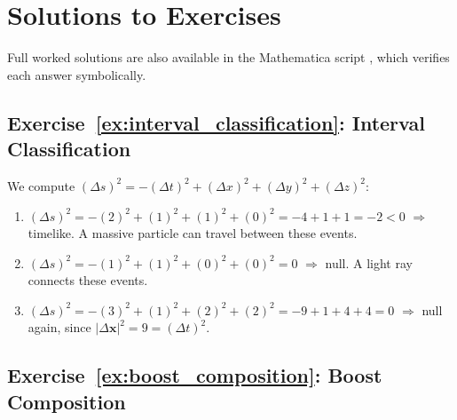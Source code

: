 
\section{Solutions to Exercises}
\label{sec:sr_solutions}

\noindent
Full worked solutions are also available in the Mathematica script
,
which verifies each answer symbolically.

\subsection*{Exercise~\ref{ex:interval_classification}: Interval Classification}

We compute $(\Delta s)^2 = -(\Delta t)^2 + (\Delta x)^2 + (\Delta y)^2 + (\Delta z)^2$:
\begin{enumerate}[label=(\alph*)]
    \item $(\Delta s)^2 = -(2)^2 + (1)^2 + (1)^2 + (0)^2 = -4 + 1 + 1 = -2 < 0$
          $\Rightarrow$ timelike.  A massive particle can travel between these events.

    \item $(\Delta s)^2 = -(1)^2 + (1)^2 + (0)^2 + (0)^2 = 0$
          $\Rightarrow$ null.  A light ray connects these events.

    \item $(\Delta s)^2 = -(3)^2 + (1)^2 + (2)^2 + (2)^2 = -9 + 1 + 4 + 4 = 0$
          $\Rightarrow$ null again, since $|\Delta\mathbf{x}|^2 = 9 = (\Delta t)^2$.
\end{enumerate}

\subsection*{Exercise~\ref{ex:boost_composition}: Boost Composition}

